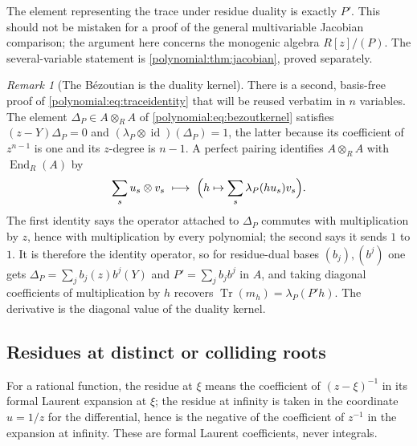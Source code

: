 \documentclass[11pt,letterpaper]{article}
\numberwithin{equation}{section}
\theoremstyle{definition}
\theoremstyle{remark}\newtheorem{remark}[theorem]{Remark}
\newcommand{\Tr}{\operatorname{Tr}}
\newcommand{\id}{\operatorname{id}}
\begin{document}
The element representing the trace under residue duality is exactly $P'$. This
should not be mistaken for a proof of the general multivariable Jacobian
comparison; the argument here concerns the monogenic algebra $R[z]/(P)$. The
several-variable statement is \cref{polynomial:thm:jacobian}, proved
separately.

\begin{remark}[The B\'ezoutian is the duality kernel]
\label{polynomial:rem:kernelmap}
There is a second, basis-free proof of
\eqref{polynomial:eq:traceidentity} that will be reused verbatim in $n$
variables. The element $\Delta_P\in A\otimes_RA$ of
\eqref{polynomial:eq:bezoutkernel} satisfies $(z-Y)\Delta_P=0$ and
$(\lambda_P\otimes\id)(\Delta_P)=1$, the latter because its coefficient of
$z^{n-1}$ is one and its $z$-degree is $n-1$. A perfect pairing identifies
$A\otimes_RA$ with $\operatorname{End}_R(A)$ by
\begin{equation}\label{polynomial:eq:kernelmap}
 \sum_su_s\otimes v_s\ \longmapsto\ \Bigl(h\mapsto\sum_s\lambda_P(hu_s)v_s\Bigr).
\end{equation}
The first identity says the operator attached to $\Delta_P$ commutes with
multiplication by $z$, hence with multiplication by every polynomial; the
second says it sends $1$ to $1$. It is therefore the identity operator, so for
residue-dual bases $(b_j),(b^j)$ one gets
$\Delta_P=\sum_jb_j(z)b^j(Y)$ and $P'=\sum_jb_jb^j$ in $A$, and taking
diagonal coefficients of multiplication by $h$ recovers
$\Tr(m_h)=\lambda_P(P'h)$. The derivative is the diagonal value of the duality
kernel.
\end{remark}

\subsection{Residues at distinct or colliding roots}
For a rational function, the residue at $\xi$ means the coefficient of
$(z-\xi)^{-1}$ in its formal Laurent expansion at $\xi$; the residue at
infinity is taken in the coordinate $u=1/z$ for the differential, hence is the
negative of the coefficient of $z^{-1}$ in the expansion at infinity. These
are formal Laurent coefficients, never integrals.
\end{document}
